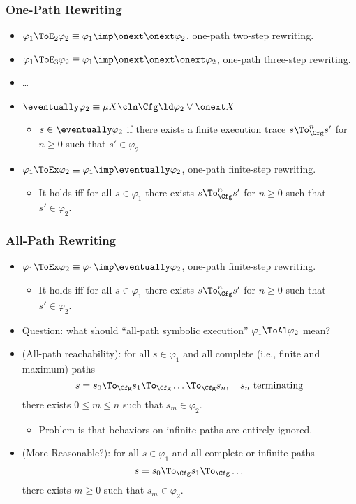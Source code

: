 \begin{frame}
\frametitle{One-Path Rewriting}
\begin{itemize}
\item $\varphi_1 \ToE_2 \varphi_2 \equiv 
       \varphi_1 \imp \onext \onext \varphi_2$,
one-path two-step rewriting.
\item $\varphi_1 \ToE_3 \varphi_2 \equiv 
       \varphi_1 \imp \onext\onext \onext \varphi_2$,
one-path three-step rewriting.
\item \dots
\item $\eventually \varphi_2 \equiv \mu X \cln \Cfg \ld \varphi_2 \lor \onext X$
\begin{itemize}
\item $s \in \eventually\varphi_2$ if
      there exists a finite execution trace
      $s \To_\Cfg^n s'$ for $n \ge 0$ such that
      $s' \in \varphi_2$
\end{itemize}
\item $\varphi_1 \ToEx \varphi_2 \equiv
       \varphi_1 \imp \eventually\varphi_2$, one-path finite-step rewriting.
\begin{itemize}
\item It holds iff for all $s \in \varphi_1$
      there exists $s \To_\Cfg^n s'$ for $n \ge 0$ such that
      $s' \in \varphi_2$.
\end{itemize}
\end{itemize}
\end{frame}

\begin{frame}
\frametitle{All-Path Rewriting}
\begin{itemize}
\item $\varphi_1 \ToEx \varphi_2 \equiv
       \varphi_1 \imp \eventually\varphi_2$, one-path finite-step rewriting.
\begin{itemize}
\item It holds iff for all $s \in \varphi_1$
      there exists $s \To_\Cfg^n s'$ for $n \ge 0$ such that
      $s' \in \varphi_2$.
\end{itemize}
\item Question: what should ``all-path symbolic execution''
      $\varphi_1 \ToAl \varphi_2$ mean? 
\item (All-path reachability):
      for all $s \in \varphi_1$ and all complete 
      (i.e., finite and maximum) paths
      \[s = s_0 \To_\Cfg s_1 \To_\Cfg \dots \To_\Cfg s_n,\quad
       \text{$s_n$ terminating} \]
      there exists $0 \le m \le n$ such that $s_m \in \varphi_2$.
\begin{itemize}
\item Problem is that behaviors on infinite paths are entirely ignored. 
\end{itemize}
\item (More Reasonable?):
      for all $s \in \varphi_1$ and all complete or infinite
      paths
      \[s = s_0 \To_\Cfg s_1 \To_\Cfg \dots\]
      there exists $m \ge 0$ such that $s_m \in \varphi_2$.
\end{itemize}
\end{frame}

